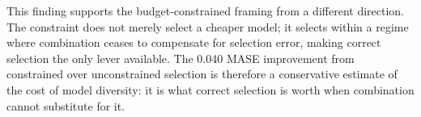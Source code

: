 This finding supports the budget-constrained framing from a different direction. The constraint does not merely select a cheaper model; it selects within a regime where combination ceases to compensate for selection error, making correct selection the only lever available. The 0.040 MASE improvement from constrained over unconstrained selection is therefore a conservative estimate of the cost of model diversity: it is what correct selection is worth when combination cannot substitute for it.
